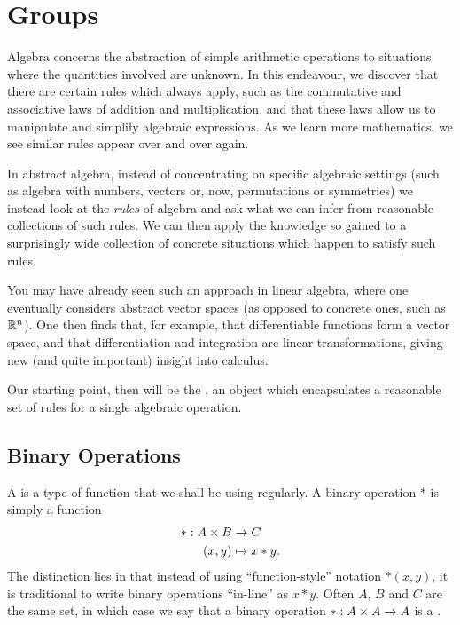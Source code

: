 \chapter{Groups}

Algebra concerns the abstraction of simple arithmetic operations to
situations where the quantities involved are unknown.  In this endeavour,
we discover that there are certain rules which always apply,
such as the commutative and associative laws of addition and multiplication,
and that these laws allow us to manipulate and simplify algebraic
expressions. As we learn more mathematics, we see similar rules appear over
and over again.

In abstract algebra, instead of concentrating on specific algebraic
settings (such as algebra with numbers, vectors or, now, permutations or
symmetries) we instead look
at the \emph{rules} of algebra and ask what we can infer from reasonable
collections of such rules.  We can then apply the knowledge so gained to a
surprisingly wide collection of concrete situations which happen to satisfy
such rules.

You may have already seen such an approach in linear algebra, where one
eventually considers abstract vector spaces (as opposed to concrete ones, such
as $\mathbb{R}^{n}$).  One then finds that, for example, that differentiable
functions form a vector space, and that differentiation and integration are
linear transformations, giving new (and quite important) insight into calculus.

Our starting point,
then will be the , an object which encapsulates a reasonable set
of rules for a single algebraic operation.

\section{Binary Operations}

A  is a type of function that we shall be
using regularly.  A binary operation $\ast$ is simply a function
\begin{align*}
  \ast : A \times B &\to C\\
         (x,y) &\mapsto x \ast y.
\end{align*}
The distinction lies in that instead of using ``function-style'' notation
$\ast(x,y)$, it is traditional to write binary operations ``in-line'' as
$x \ast y$.  Often $A$, $B$ and $C$ are the same set, in which case we say
that a binary operation $\ast : A \times A \to A$ is a .

